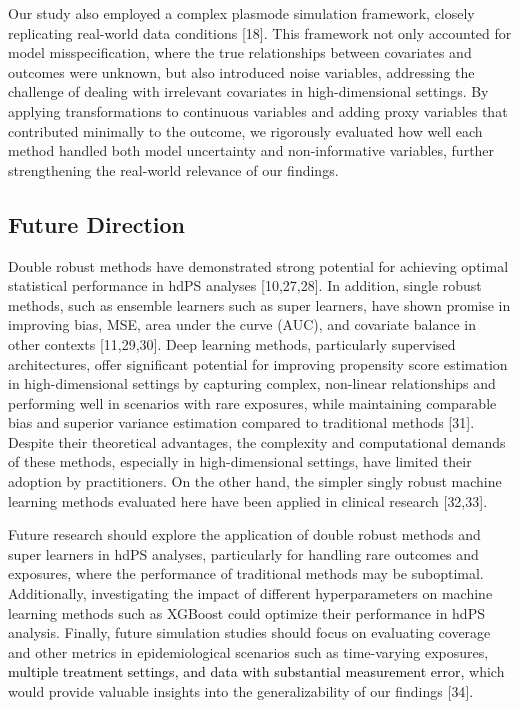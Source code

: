 \documentclass[10pt,letterpaper]{article}
\begin{document}
Our study also employed a complex plasmode simulation framework, closely
replicating real-world data conditions {[}18{]}. This framework not only
accounted for model misspecification, where the true relationships
between covariates and outcomes were unknown, but also introduced noise
variables, addressing the challenge of dealing with irrelevant
covariates in high-dimensional settings. By applying transformations to
continuous variables and adding proxy variables that contributed
minimally to the outcome, we rigorously evaluated how well each method
handled both model uncertainty and non-informative variables, further
strengthening the real-world relevance of our findings.

\subsection{Future Direction}\label{future-direction}

Double robust methods have demonstrated strong potential for achieving
optimal statistical performance in hdPS analyses {[}10,27,28{]}. In
addition, single robust methods, such as ensemble learners such as super
learners, have shown promise in improving bias, MSE, area under the
curve (AUC), and covariate balance in other contexts {[}11,29,30{]}.
Deep learning methods, particularly supervised architectures, offer
significant potential for improving propensity score estimation in
high-dimensional settings by capturing complex, non-linear relationships
and performing well in scenarios with rare exposures, while maintaining
comparable bias and superior variance estimation compared to traditional
methods {[}31{]}. Despite their theoretical advantages, the complexity
and computational demands of these methods, especially in
high-dimensional settings, have limited their adoption by practitioners.
On the other hand, the simpler singly robust machine learning methods
evaluated here have been applied in clinical research {[}32,33{]}.

Future research should explore the application of double robust methods
and super learners in hdPS analyses, particularly for handling rare
outcomes and exposures, where the performance of traditional methods may
be suboptimal. Additionally, investigating the impact of different
hyperparameters on machine learning methods such as XGBoost could
optimize their performance in hdPS analysis. Finally, future simulation
studies should focus on evaluating coverage and other metrics in
epidemiological scenarios such as time-varying exposures,
\textcolor{black}{multiple treatment settings, and data with substantial measurement error,}
which would provide valuable insights into the generalizability of our
findings {[}34{]}.
\end{document}

